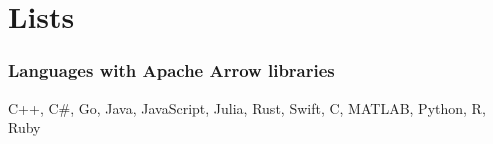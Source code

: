 \section{Lists}
\subsubsection{Languages with Apache Arrow libraries}
\label{subsubsection:arrow:langs}
C++, C\#, Go, Java, JavaScript, Julia, Rust, Swift, C, MATLAB, Python, R, Ruby \autocite{arrow:overview}

